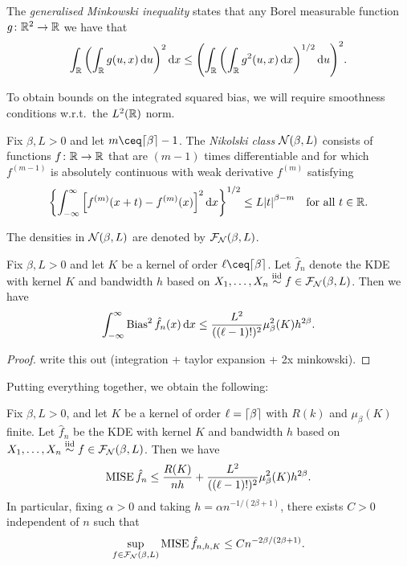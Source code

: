 \begin{recap}
	The \emph{generalised Minkowski inequality} states that any Borel measurable function $g \colon \mathbb R^2 \to \mathbb R$ we have that
	\[
	\int_\mathbb R \qty(\int_\mathbb R g(u, x) \dd{u})^2 \dd{x} \leq \qty(\int_\mathbb R \qty(\int_\mathbb R g^2(u, x) \dd{x})^{1/2} \dd{u})^2. 
	\] 
\end{recap}
To obtain bounds on the integrated squared bias, we will require smoothness conditions w.r.t.\ the $L^2(\mathbb R)$ norm. 
\begin{definition}
	Fix $\beta, L > 0$ and let $m \ceq \ceil{\beta} - 1$. The \emph{Nikolski class} $\mathcal N(\beta, L)$ consists of functions $f \colon \mathbb R \to \mathbb R$ that are $(m-1)$ times differentiable and for  which $f^{(m-1)}$ is absolutely continuous with weak derivative $f^{(m)}$ satisfying
	\[
	\qty{\int_{-\infty}^\infty \qty[ f^{(m)}(x + t) - f^{(m)}(x)]^2 \dd{x}}^{1/2} \leq L \abs{t}^{\beta - m} \quad\text{for all $t \in \mathbb R$}. 
	\]
	
	The densities in $\mathcal N(\beta, L)$ are denoted by $\mathcal F_\mathcal N(\beta, L)$. 
\end{definition}

\begin{proposition}
	Fix $\beta, L> 0$ and let $K$ be a kernel of order $\ell \ceq \ceil\beta$. Let $\hat f_n$ denote the KDE with kernel $K$ and bandwidth $h$ based on $X_1, \dotsc, X_n \overset{\mathrm{iid}}{\sim} f \in \mathcal F_\mathcal N(\beta, L)$. Then we have
	\[
	\int_{-\infty}^\infty \operatorname{Bias}^2 \hat f_n(x) \dd{x} \leq \frac{L^2}{((\ell - 1)!)^2} \mu_\beta^2(K) h^{2\beta}. 
	\]
\end{proposition}

\begin{proof}
	\TODO write this out (integration + taylor expansion + 2x minkowski). 
\end{proof}

Putting everything together, we obtain the following:
\begin{theorem}
	Fix $\beta, L > 0$, and let $K$ be a kernel of order $\ell = \lceil\beta\rceil$ with $R(k)$ and $\mu_\beta(K)$ finite. Let $\hat f_n$ be the KDE with kernel $K$ and bandwidth $h$ based on $X_1, \dotsc, X_n \overset{\mathrm{iid}}{\sim} f \in \mathcal F_\mathcal N(\beta, L)$. Then we have
	\[
	\operatorname{MISE}\hat f_n \leq \frac{R(K)}{nh} + \frac{L^2}{((\ell - 1)!)^2} \mu_\beta^2(K) h^{2\beta}. 
	\]
	In particular, fixing $\alpha > 0$ and taking $h = \alpha n^{-1/(2\beta + 1)}$, there exists $C > 0$ independent of $n$ such that
	\[
	\sup_{f \in \mathcal F_\mathcal N(\beta, L)} \operatorname{MISE} \hat f_{n, h, K} \leq C n^{-2\beta/(2\beta + 1)}. 
	\]
\end{theorem}

